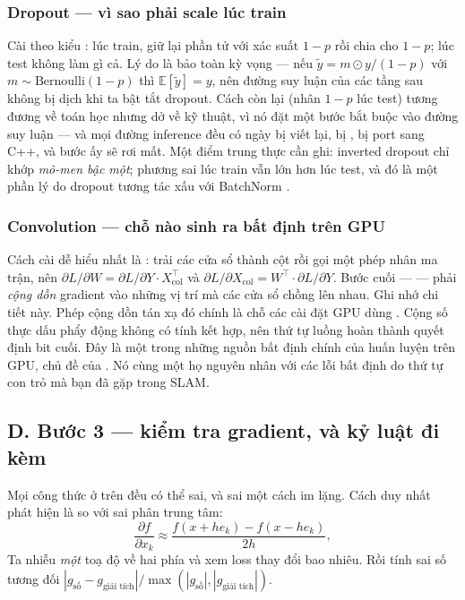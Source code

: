 \documentclass[../../../deep_learning.tex]{subfiles}
\begin{document}
\subsubsection{Dropout --- vì sao phải scale lúc train}
Cài theo kiểu : lúc train, giữ lại phần tử với xác suất $1-p$ rồi chia cho $1-p$; lúc test không làm gì cả. Lý do là bảo toàn kỳ vọng --- nếu $\tilde{y} = m \odot y/(1-p)$ với $m \sim \mathrm{Bernoulli}(1-p)$ thì $\mathbb{E}[\tilde{y}] = y$, nên đường suy luận của các tầng sau không bị dịch khi ta bật tắt dropout. Cách còn lại (nhân $1-p$ lúc test) tương đương về toán học nhưng dở về kỹ thuật, vì nó đặt một bước bắt buộc vào đường suy luận --- và mọi đường inference đều có ngày bị viết lại, bị , bị port sang C++, và bước ấy sẽ rơi mất. Một điểm trung thực cần ghi: inverted dropout chỉ khớp \emph{mô-men bậc một}; phương sai lúc train vẫn lớn hơn lúc test, và đó là một phần lý do dropout tương tác xấu với BatchNorm \cite{srivastava2014dropout}.

\subsubsection{Convolution --- chỗ nào sinh ra bất định trên GPU}
Cách cài dễ hiểu nhất là : trải các cửa sổ thành cột rồi gọi một phép nhân ma trận, nên $\partial L/\partial W = \partial L/\partial Y \cdot X_{\mathrm{col}}^{\top}$ và $\partial L/\partial X_{\mathrm{col}} = W^{\top}\cdot \partial L/\partial Y$. Bước cuối ---  --- phải \emph{cộng dồn} gradient vào những vị trí mà các cửa sổ chồng lên nhau. Ghi nhớ chi tiết này. Phép cộng dồn tán xạ đó chính là chỗ các cài đặt GPU dùng . Cộng số thực dấu phẩy động không có tính kết hợp, nên thứ tự luồng hoàn thành quyết định bit cuối. Đây là một trong những nguồn bất định chính của huấn luyện trên GPU, chủ đề của . Nó cùng một họ nguyên nhân với các lỗi bất định do thứ tự con trỏ mà bạn đã gặp trong SLAM.


\subsection{D. Bước 3 --- kiểm tra gradient, và kỷ luật đi kèm}
Mọi công thức ở trên đều có thể sai, và sai một cách im lặng. Cách duy nhất phát hiện là so với sai phân trung tâm:
\[
\frac{\partial f}{\partial x_k} \approx \frac{f(x + h e_k) - f(x - h e_k)}{2h},
\]
Ta nhiễu \emph{một} toạ độ về hai phía và xem loss thay đổi bao nhiêu. Rồi tính sai số tương đối $\left|g_{\text{số}} - g_{\text{giải tích}}\right| / \max(|g_{\text{số}}|, |g_{\text{giải tích}}|)$.
\end{document}
